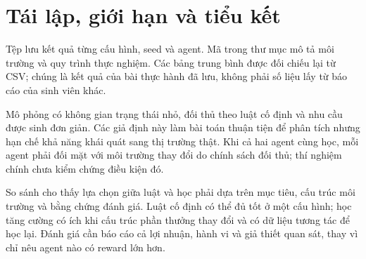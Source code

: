 \section{Tái lập, giới hạn và tiểu kết}
Tệp  lưu kết quả từng cấu hình, seed và agent. Mã trong thư mục  mô tả môi trường và quy trình thực nghiệm. Các bảng trung bình được đối chiếu lại từ CSV; chúng là kết quả của bài thực hành đã lưu, không phải số liệu lấy từ báo cáo của sinh viên khác.

Mô phỏng có không gian trạng thái nhỏ, đối thủ theo luật cố định và nhu cầu được sinh đơn giản. Các giả định này làm bài toán thuận tiện để phân tích nhưng hạn chế khả năng khái quát sang thị trường thật. Khi cả hai agent cùng học, mỗi agent phải đối mặt với môi trường thay đổi do chính sách đối thủ; thí nghiệm chính chưa kiểm chứng điều kiện đó.

So sánh cho thấy lựa chọn giữa luật và học phải dựa trên mục tiêu, cấu trúc môi trường và bằng chứng đánh giá. Luật cố định có thể đủ tốt ở một cấu hình; học tăng cường có ích khi cấu trúc phần thưởng thay đổi và có dữ liệu tương tác để học lại. Đánh giá cần báo cáo cả lợi nhuận, hành vi và giả thiết quan sát, thay vì chỉ nêu agent nào có reward lớn hơn.
